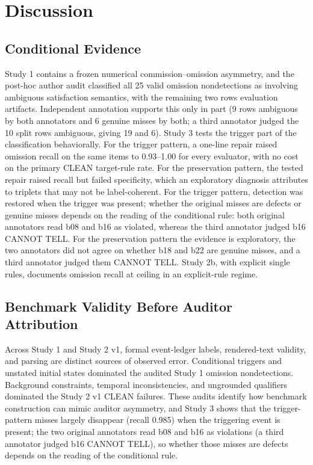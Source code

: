 \documentclass{ieeeaccess}
\begin{document}
\section{Discussion}
\subsection{Conditional Evidence}
Study 1 contains a frozen numerical commission--omission asymmetry, and the post-hoc author audit classified all 25 valid omission nondetections as involving ambiguous satisfaction semantics, with the remaining two rows evaluation artifacts. Independent annotation supports this only in part (9 rows ambiguous by both annotators and 6 genuine misses by both; a third annotator judged the 10 split rows ambiguous, giving 19 and 6). Study 3 tests the trigger part of the classification behaviorally. For the trigger pattern, a one-line repair raised omission recall on the same items to 0.93--1.00 for every evaluator, with no cost on the primary CLEAN target-rule rate. For the preservation pattern, the tested repair raised recall but failed specificity, which an exploratory diagnosis attributes to triplets that may not be label-coherent. For the trigger pattern, detection was restored when the trigger was present; whether the original misses are defects or genuine misses depends on the reading of the conditional rule: both original annotators read b08 and b16 as violated, whereas the third annotator judged b16 CANNOT TELL. For the preservation pattern the evidence is exploratory, the two annotators did not agree on whether b18 and b22 are genuine misses, and a third annotator judged them CANNOT TELL. Study 2b, with explicit single rules, documents omission recall at ceiling in an explicit-rule regime.

\subsection{Benchmark Validity Before Auditor Attribution}
Across Study 1 and Study 2 v1, formal event-ledger labels, rendered-text validity, and parsing are distinct sources of observed error. Conditional triggers and unstated initial states dominated the audited Study 1 omission nondetections. Background constraints, temporal inconsistencies, and ungrounded qualifiers dominated the Study 2 v1 CLEAN failures. These audits identify how benchmark construction can mimic auditor asymmetry, and Study 3 shows that the trigger-pattern misses largely disappear (recall 0.985) when the triggering event is present; the two original annotators read b08 and b16 as violations (a third annotator judged b16 CANNOT TELL), so whether those misses are defects depends on the reading of the conditional rule.
\end{document}
